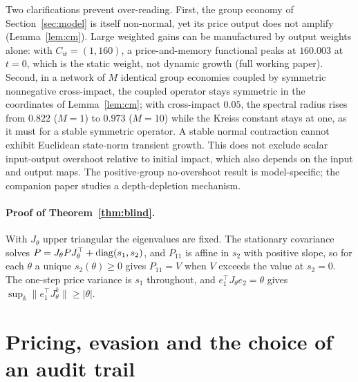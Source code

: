 \documentclass[12pt]{article}
\theoremstyle{definition}
\theoremstyle{remark}
\begin{document}
Two clarifications prevent over-reading. First, the group economy of Section~\ref{sec:model} is itself non-normal, yet its price output does not amplify (Lemma~\ref{lem:cm}). Large weighted gains can be manufactured by output weights alone: with $C_w=(1,160)$, a price-and-memory functional peaks at $160.003$ at $t=0$, which is the static weight, not dynamic growth (full working paper). Second, in a network of $M$ identical group economies coupled by symmetric nonnegative cross-impact, the coupled operator stays symmetric in the coordinates of Lemma~\ref{lem:cm}; with cross-impact $0.05$, the spectral radius rises from $0.822$ ($M=1$) to $0.973$ ($M=10$) while the Kreiss constant stays at one, as it must for a stable symmetric operator. A stable normal contraction cannot exhibit Euclidean state-norm transient growth. This does not exclude scalar input-output overshoot relative to initial impact, which also depends on the input and output maps. The positive-group no-overshoot result is model-specific; the companion paper studies a depth-depletion mechanism.
\paragraph{Proof of Theorem~\ref{thm:blind}.}
 With $J_\theta$ upper triangular the eigenvalues are fixed. The stationary covariance solves $P=J_\theta PJ_\theta^\top+{\rm diag}(s_1,s_2)$, and $P_{11}$ is affine in $s_2$ with positive slope, so for each $\theta$ a unique $s_2(\theta)\ge0$ gives $P_{11}=V$ when $V$ exceeds the value at $s_2=0$. The one-step price variance is $s_1$ throughout, and $e_1^\top J_\theta e_2=\theta$ gives $\sup_k\|e_1^\top J_\theta^k\|\ge|\theta|$.


\section{Pricing, evasion and the choice of an audit trail}\label{app:restored_policy}
\end{document}
